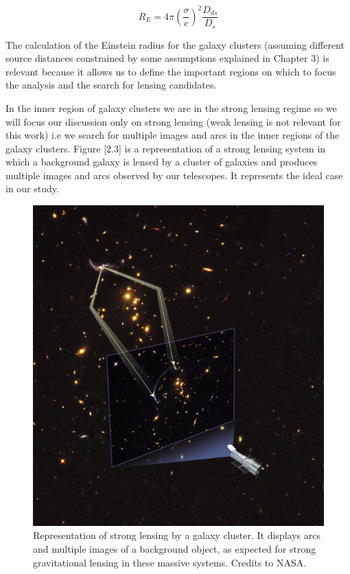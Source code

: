 \begin{equation}
R_E=4\pi\left(\frac{\sigma}{c}\right)^{2}\frac{D_{ds}}{D_{s}}
\end{equation}

The calculation of the Einstein radius for the galaxy clusters (assuming different source distances constrained by some assumptions explained in Chapter 3) is relevant because it allows us to define the important regions on which to focus the analysis and the search for lensing candidates.

In the inner region of galaxy clusters we are in the strong lensing regime so we will focus our discussion only on strong lensing (weak lensing is not relevant for this work) i.e we search for multiple images and arcs in the inner regions of the galaxy clusters. Figure [2.3] is a representation of a strong lensing system in which a background galaxy is lensed by a cluster of galaxies and produces multiple images and arcs observed by our telescopes. It represents the ideal case in our study. 

\begin{figure}[H]
\centering
\includegraphics[width=12cm]{images/lensing.jpg}
\caption[Strong Lensing representation]{Representation of strong lensing by a galaxy cluster. It displays arcs and multiple images of a background object, as expected for strong gravitational lensing in these massive systems. Credits to NASA.}
\end{figure}

